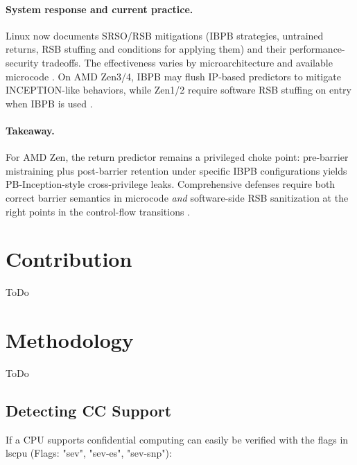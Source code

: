 \documentclass[11pt,a4paper]{article}
\begin{document}
\paragraph{System response and current practice.}
Linux now documents SRSO/RSB mitigations (IBPB strategies, untrained returns, RSB stuffing and conditions for applying them) and their performance-security tradeoffs. The effectiveness varies by microarchitecture and available microcode \cite{linux_srso_doc,linux_rsb_doc}. On AMD Zen3/4, IBPB may flush IP-based predictors to mitigate INCEPTION-like behaviors, while Zen1/2 require software RSB stuffing on entry when IBPB is used \cite{wikner2025breaking,amd_srso_whitepaper}.

\paragraph{Takeaway.}
For AMD Zen, the return predictor remains a privileged choke point: pre-barrier mistraining plus post-barrier retention under specific IBPB configurations yields PB-Inception-style cross-privilege leaks. Comprehensive defenses require both correct barrier semantics in microcode \emph{and} software-side RSB sanitization at the right points in the control-flow transitions \cite{wikner2025breaking,trujillo2023inception,linux_srso_doc}.

\section{Contribution}
ToDo

\section{Methodology}
ToDo
\subsection{Detecting CC Support}
If a CPU supports confidential computing can easily be verified with the flags in lscpu (Flags: "sev", "sev-es", "sev-snp"):
\end{document}
